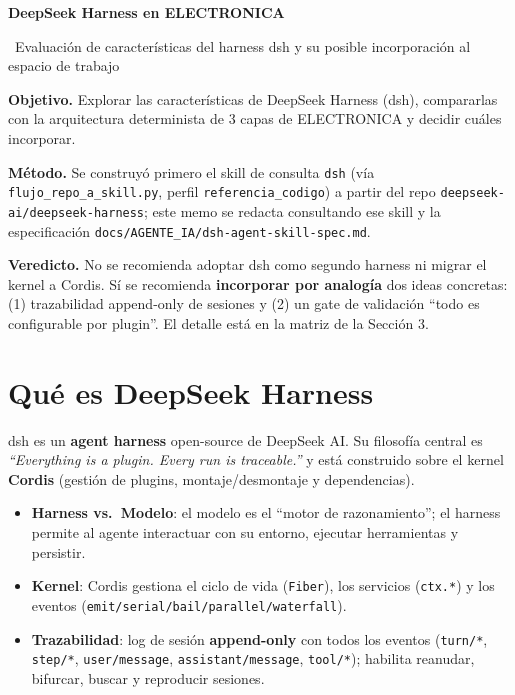 \documentclass[11pt,a4paper]{article}
\newcommand{\iconoBanda}{microchip}
\newcommand{\bandaTitulo}[3][fondoOscuro]{%
  \begin{tcolorbox}[
    enhanced,
    colback=#1, colframe=#1,
    boxrule=0pt, arc=8pt, outer arc=8pt,
    width=\linewidth,
    top=18pt, bottom=6pt, left=14pt, right=14pt,
    borderline south={3.5pt}{0pt}{cyanNeon},
  ]
    \begin{minipage}[c]{0.07\linewidth}
      \centering
      \textcolor{cyanNeon}{\fontsize{30}{30}\selectfont\faIcon{\iconoBanda}}
    \end{minipage}%
    \hspace{8pt}%
    \begin{minipage}[c]{0.88\linewidth}
      {\fontsize{20}{24}\selectfont\bfseries\color{white}#2}\par\vspace{5pt}%
      \textcolor{cyanNeon!80!white}{\small\faIcon{angle-right}~#3}%
    \end{minipage}
    \vspace{4pt}
  \end{tcolorbox}%
  \vspace{8pt}%
}
\renewcommand{\iconoBanda}{sitemap}
\begin{document}
\bandaTitulo[fondoOscuro]{DeepSeek Harness en ELECTRONICA}{Evaluación de características del harness dsh y su posible incorporación al espacio de trabajo}

\vspace{6pt}

\begin{tcolorbox}[tarjetaDato, title={\faIcon{clipboard-list}~Resumen ejecutivo}]
\textbf{Objetivo.} Explorar las características de DeepSeek Harness (dsh), compararlas con la
arquitectura determinista de 3 capas de ELECTRONICA y decidir cuáles incorporar.

\textbf{Método.} Se construyó primero el skill de consulta \texttt{dsh}
(vía \texttt{flujo\_repo\_a\_skill.py}, perfil \texttt{referencia\_codigo}) a partir del repo
\texttt{deepseek-ai/deepseek-harness}; este memo se redacta consultando ese skill y la
especificación \texttt{docs/AGENTE\_IA/dsh-agent-skill-spec.md}.

\textbf{Veredicto.} No se recomienda adoptar dsh como segundo harness ni migrar el kernel a
Cordis. Sí se recomienda \textbf{incorporar por analogía} dos ideas concretas: (1) trazabilidad
append-only de sesiones y (2) un gate de validación ``todo es configurable por plugin''.
El detalle está en la matriz de la Sección 3.
\end{tcolorbox}

\section{Qué es DeepSeek Harness}

dsh es un \textbf{agent harness} open-source de DeepSeek AI. Su filosofía central es
\textit{``Everything is a plugin. Every run is traceable.''} y está construido sobre el kernel
\textbf{Cordis} (gestión de plugins, montaje/desmontaje y dependencias).

\begin{itemize}[leftmargin=*,topsep=2pt,itemsep=1pt]
  \item \textbf{Harness vs.\ Modelo}: el modelo es el ``motor de razonamiento''; el harness
        permite al agente interactuar con su entorno, ejecutar herramientas y persistir.
  \item \textbf{Kernel}: Cordis gestiona el ciclo de vida (\texttt{Fiber}), los servicios
        (\texttt{ctx.*}) y los eventos (\texttt{emit/serial/bail/parallel/waterfall}).
  \item \textbf{Trazabilidad}: log de sesión \textbf{append-only} con todos los eventos
        (\texttt{turn/*}, \texttt{step/*}, \texttt{user/message}, \texttt{assistant/message},
        \texttt{tool/*}); habilita reanudar, bifurcar, buscar y reproducir sesiones.
\end{itemize}
\end{document}
